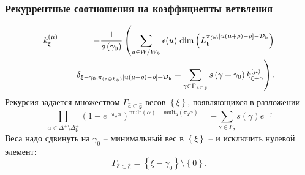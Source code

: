 \documentclass[pdftex]{beamer}
\newcommand{\gfh}{\hat{\mathfrak{g}}}
\newcommand{\afh}{\hat{\mathfrak{a}}}
\theoremstyle{definition} \newtheorem{Def}{Определение}
\begin{document}
\begin{frame}
  \frametitle{Рекуррентные соотношения на коэффициенты ветвления}
  
\begin{eqnarray*}
k_{\xi }^{\left( \mu \right) } &=&-\frac{1}{s\left( \gamma _{0}\right) }%
\left( \sum_{u\in W/W_{\frak{b}}}\epsilon (u)\;\mathrm{dim}\left( L_{\mathfrak{b}}^{\pi
_{\left( \frak{b}\right) }\left[ u(\mu +\rho )-\rho \right] -\mathcal{D}_{%
\frak{b}}}\right) \right.\\
&&\left.\delta _{\xi -\gamma _{0},\pi _{\left( \frak{a\oplus h}%
_{\mathfrak{d}}\right) }\left[ u(\mu +\rho )-\rho \right] +\mathcal{D}_{\frak{b}%
}}+
\sum_{\gamma \in \Gamma _{\afh\subset \gfh}}s\left( \gamma
+\gamma _{0}\right) k_{\xi +\gamma }^{\left( \mu \right) }\right) \text{.}
\end{eqnarray*}
Рекурсия задается множеством $\Gamma _{\afh\subset \gfh}$ весов $\left\{\xi\right\}$, появляющихся в разложении
\begin{equation*}
\prod_{\alpha \in \Delta ^{+}\setminus \Delta _{\mathfrak{b} }^{+}}\left( 1-e^{-\pi
_{\afh}\alpha }\right) ^{\mathrm{mult}(\alpha )-\mathrm{mult}_{\afh}(\pi _{\afh}\alpha )}=-\sum_{\gamma \in P_{\afh}}s(\gamma )e^{-\gamma }
\end{equation*}
Веса надо сдвинуть на  $\gamma _{0}$ -- минимальный вес в  $\left\{ \xi\right\} $ -- и исключить нулевой элемент:
\begin{equation*}
\Gamma _{\afh\subset \gfh}=\left\{ \xi -\gamma
_{0}\right\} \setminus \left\{ 0\right\} .
\end{equation*}
\end{frame}
\end{document}
